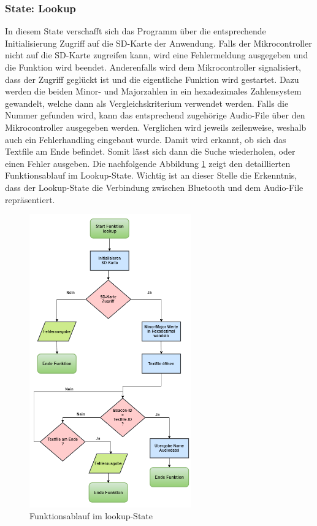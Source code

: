 \subsubsection*{State: Lookup}
In diesem State verschafft sich das Programm über die entsprechende Initialisierung Zugriff auf die SD-Karte der Anwendung. Falls der Mikrocontroller nicht auf die SD-Karte zugreifen kann, wird eine Fehlermeldung ausgegeben und die Funktion wird beendet. Anderenfalls wird dem Mikrocontroller signalisiert, dass der Zugriff geglückt ist und die eigentliche Funktion wird gestartet. Dazu werden die beiden Minor- und Majorzahlen in ein hexadezimales Zahlensystem gewandelt, welche dann als Vergleichskriterium verwendet werden. Falls die Nummer gefunden wird, kann das entsprechend zugehörige Audio-File über den Mikrocontroller ausgegeben werden. Verglichen wird jeweils zeilenweise, weshalb auch ein Fehlerhandling eingebaut wurde. Damit wird erkannt, ob sich das Textfile am Ende befindet. Somit lässt sich dann die Suche wiederholen, oder einen Fehler ausgeben. Die nachfolgende Abbildung \ref{fig:lookupState} zeigt den detaillierten Funktionsablauf im Lookup-State. Wichtig ist an dieser Stelle die Erkenntnis, dass der Lookup-State die Verbindung zwischen Bluetooth und dem Audio-File repräsentiert.

\begin{figure}[htbp!!!!]
	\centering
	\includegraphics[width=0.62\textwidth]{Data/lookup_picture}
	\caption[Statemachine: lookup]{Funktionsablauf im lookup-State}
	\label{fig:lookupState}
\end{figure} 

